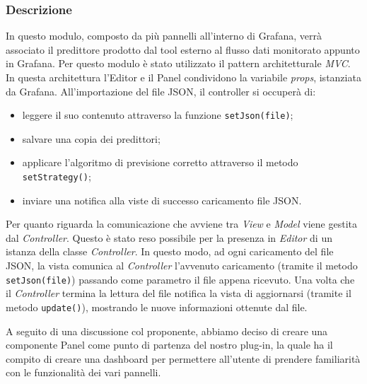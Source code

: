 \subsubsection{Descrizione}
In questo modulo, composto da più pannelli all'interno di Grafana, verrà associato il predittore prodotto dal tool esterno al flusso dati monitorato appunto in Grafana. Per questo modulo è stato utilizzato il pattern architetturale \textit{MVC}.
In questa architettura l’Editor e il Panel condividono la variabile \textit{props}, istanziata da Grafana. 
All’importazione del file JSON, il controller si occuperà di: \begin{itemize}
\item leggere il suo contenuto attraverso la funzione \texttt{setJson(file)};
\item salvare una copia dei predittori;
\item applicare l'algoritmo di previsione corretto attraverso il metodo \texttt{setStrategy()};
\item inviare una notifica alla viste di successo caricamento file JSON.
\end{itemize}

Per quanto riguarda la comunicazione che avviene tra \textit{View} e \textit{Model} viene gestita dal \textit{Controller}. Questo è stato reso possibile per la presenza in \textit{Editor} di un istanza della classe \textit{Controller}. In questo modo, ad ogni caricamento del file JSON, la vista comunica al \textit{Controller} l'avvenuto caricamento (tramite il metodo \texttt{setJson(file)}) passando come parametro il file appena ricevuto.
Una volta che il \textit{Controller} termina la lettura del file notifica la vista di aggiornarsi (tramite il metodo \texttt{update()}), mostrando le nuove informazioni ottenute dal file.

A seguito di una discussione col proponente, abbiamo deciso di creare una componente Panel come punto di partenza del nostro plug-in, la quale ha il compito di creare una dashboard per permettere all’utente di prendere familiarità con le funzionalità dei vari pannelli.

